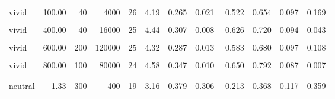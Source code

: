 \documentclass[
]{article}
\begin{document}
\begin{longtable}[t]{lrrrrrrlrrrl}
\hspace{1em}vivid & 100.00 & 40 & 4000 & 26 & 4.19 & 0.265 & 0.021 & 0.522 & 0.654 & 0.097 & 0.169\\
\hspace{1em}\cellcolor{gray!10}{vivid} & \cellcolor{gray!10}{400.00} & \cellcolor{gray!10}{10} & \cellcolor{gray!10}{4000} & \cellcolor{gray!10}{25} & \cellcolor{gray!10}{4.60} & \cellcolor{gray!10}{0.264} & \cellcolor{gray!10}{0.001} & \cellcolor{gray!10}{0.852} & \cellcolor{gray!10}{0.800} & \cellcolor{gray!10}{0.083} & \cellcolor{gray!10}{0.004}\\
\hspace{1em}vivid & 400.00 & 40 & 16000 & 25 & 4.44 & 0.307 & 0.008 & 0.626 & 0.720 & 0.094 & 0.043\\
\hspace{1em}\cellcolor{gray!10}{vivid} & \cellcolor{gray!10}{600.00} & \cellcolor{gray!10}{20} & \cellcolor{gray!10}{12000} & \cellcolor{gray!10}{24} & \cellcolor{gray!10}{4.38} & \cellcolor{gray!10}{0.318} & \cellcolor{gray!10}{0.014} & \cellcolor{gray!10}{0.573} & \cellcolor{gray!10}{0.750} & \cellcolor{gray!10}{0.092} & \cellcolor{gray!10}{0.023}\\
\hspace{1em}vivid & 600.00 & 200 & 120000 & 25 & 4.32 & 0.287 & 0.013 & 0.583 & 0.680 & 0.097 & 0.108\\
\hspace{1em}\cellcolor{gray!10}{vivid} & \cellcolor{gray!10}{800.00} & \cellcolor{gray!10}{30} & \cellcolor{gray!10}{24000} & \cellcolor{gray!10}{26} & \cellcolor{gray!10}{4.62} & \cellcolor{gray!10}{0.227} & \cellcolor{gray!10}{<0.001} & \cellcolor{gray!10}{0.984} & \cellcolor{gray!10}{0.885} & \cellcolor{gray!10}{0.065} & \cellcolor{gray!10}{<0.001}\\
\hspace{1em}vivid & 800.00 & 100 & 80000 & 24 & 4.58 & 0.347 & 0.010 & 0.650 & 0.792 & 0.087 & 0.007\\
\addlinespace[0.3em]
\multicolumn{12}{l}{\textbf{Exp. 5}}\\
\hspace{1em}\cellcolor{gray!10}{neutral} & \cellcolor{gray!10}{1.33} & \cellcolor{gray!10}{30} & \cellcolor{gray!10}{40} & \cellcolor{gray!10}{52} & \cellcolor{gray!10}{2.69} & \cellcolor{gray!10}{0.203} & \cellcolor{gray!10}{<0.001} & \cellcolor{gray!10}{-0.557} & \cellcolor{gray!10}{0.365} & \cellcolor{gray!10}{0.068} & \cellcolor{gray!10}{0.070}\\
\hspace{1em}neutral & 1.33 & 300 & 400 & 19 & 3.16 & 0.379 & 0.306 & -0.213 & 0.368 & 0.117 & 0.359\\

\end{longtable}
\end{document}

